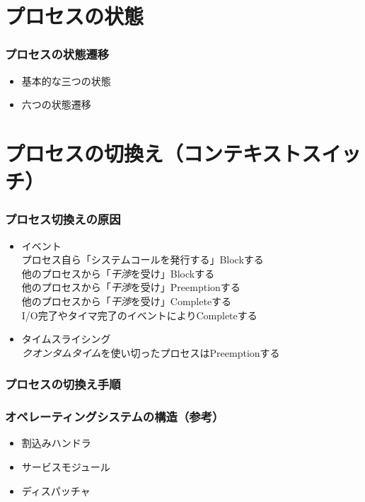 \documentclass[unicode,handout]{beamer}                   %
\begin{document}
\section{プロセスの状態}
\begin{frame}
  \frametitle{プロセスの状態遷移}
  \begin{itemize}
    \item 基本的な三つの状態
    \item 六つの状態遷移
  \end{itemize}
\end{frame}

\section{プロセスの切換え（コンテキストスイッチ）}
\begin{frame}
  \frametitle{プロセス切換えの原因}
  \begin{itemize}
    \item イベント\\
      プロセス自ら「システムコールを発行する」Blockする \\
      他のプロセスから「\emph{干渉}を受け」Blockする    \\
      他のプロセスから「\emph{干渉}を受け」Preemptionする \\
      他のプロセスから「\emph{干渉}を受け」Completeする \\
      I/O完了やタイマ完了のイベントによりCompleteする
      \vfill
    \item タイムスライシング\\
      \emph{クオンタムタイム}を使い切ったプロセスはPreemptionする
  \end{itemize}
  \vfill
\end{frame}

\begin{frame}
  \frametitle{プロセスの切換え手順}
\end{frame}

\begin{frame}
  \frametitle{オペレーティングシステムの構造（参考）}
  \begin{itemize}
    \item 割込みハンドラ
    \item サービスモジュール
    \item ディスパッチャ
  \end{itemize}
\end{frame}
\end{document}
